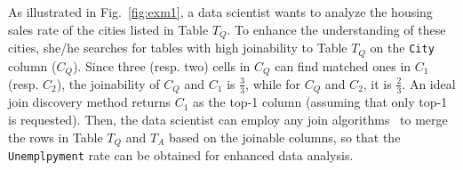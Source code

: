 \begin{example}\label{example-1}
As illustrated in Fig.~\ref{fig:exm1}, a data scientist wants to analyze the housing sales rate of the cities listed in Table $T_Q$. To enhance the understanding of these cities, she/he searches for tables with high joinability to Table $T_Q$ on the \texttt{City} column ($C_Q$). 
Since three (resp. two) cells in  $C_Q$ can find matched ones 
in $C_1$ (resp. $C_2$), the joinability of $C_Q$ and $C_1$ is $\frac{3}{3}$, while for $C_Q$ and $C_2$, it is $\frac{2}{3}$.
An ideal join discovery method returns $C_1$ as the top-1 column (assuming that only top-1 is requested). Then, the data scientist can employ any join algorithms~\cite{semanticjoin,autofuzzyjoin,Auto-Join} to merge the rows in Table $T_Q$ and $T_A$ based on the joinable columns, so that the \texttt{Unemplpyment} rate can be obtained for enhanced data analysis.
\end{example}



